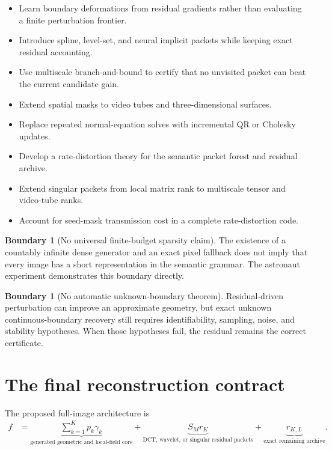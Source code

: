 \documentclass[11pt]{article}
\theoremstyle{definition}
\newtheorem{boundary}[theorem]{Boundary}
\theoremstyle{remark}
\begin{document}
\begin{itemize}
\item Learn boundary deformations from residual gradients rather than evaluating a finite perturbation frontier.
\item Introduce spline, level-set, and neural implicit packets while keeping exact residual accounting.
\item Use multiscale branch-and-bound to certify that no unvisited packet can beat the current candidate gain.
\item Extend spatial masks to video tubes and three-dimensional surfaces.
\item Replace repeated normal-equation solves with incremental QR or Cholesky updates.
\item Develop a rate-distortion theory for the semantic packet forest and residual archive.
\item Extend singular packets from local matrix rank to multiscale tensor and video-tube ranks.
\item Account for seed-mask transmission cost in a complete rate-distortion code.
\end{itemize}

\begin{boundary}[No universal finite-budget sparsity claim]
The existence of a countably infinite dense generator and an exact pixel fallback does not imply that every image has a short representation in the semantic grammar. The astronaut experiment demonstrates this boundary directly.
\end{boundary}

\begin{boundary}[No automatic unknown-boundary theorem]
Residual-driven perturbation can improve an approximate geometry, but exact unknown continuous-boundary recovery still requires identifiability, sampling, noise, and stability hypotheses. When those hypotheses fail, the residual remains the correct certificate.
\end{boundary}

\section{The final reconstruction contract}
The proposed full-image architecture is
\[
\boxed{
\begin{aligned}
f
&=
\underbrace{\sum_{k=1}^{K}p_k\gamma_k}_{\text{generated geometric and local-field core}}
+
\underbrace{S_Mr_K}_{\text{DCT, wavelet, or singular residual packets}}
+
\underbrace{r_{K,L}}_{\text{exact remaining archive}}.
\end{aligned}
}
\]
\end{document}
